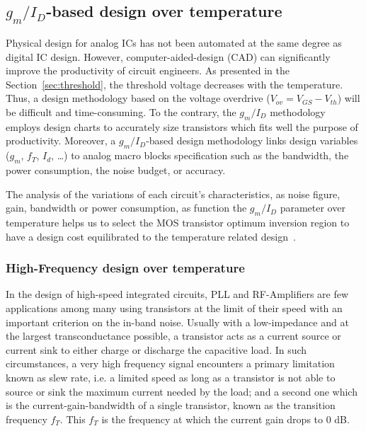 \subsection{\(g_m/I_{D} \)-based design over temperature} %
\label{sec:analog-insight}
Physical design for analog ICs has not been automated at the same degree as digital IC design. However, computer-aided-design (CAD) can significantly improve the productivity of circuit engineers. As presented in the Section~\ref{sec:threshold}, the threshold voltage decreases with the temperature. Thus, a design methodology based on the voltage overdrive ($V_{ov} = V_{GS}-V_{th}$) will be difficult and time-consuming. To the contrary, the \(g_m/I_{D} \) methodology employs design charts to accurately size transistors which fits well the purpose of productivity. Moreover, a \(g_m/I_{D} \)-based design methodology links design variables (\(g_m \), \(f_T \), \(I_d \), \ldots) to analog macro blocks specification such as the bandwidth, the power consumption, the noise budget, or accuracy.

The analysis of the variations of each circuit's characteristics, as noise figure, gain, bandwidth or power consumption, as function the \(g_m/I_{D} \) parameter over temperature helps us to select the MOS transistor optimum inversion region to have a design cost equilibrated to the temperature related design~\cite{Silveira1996,Ou2014,Ou2017,Ou2018}.

\subsubsection{High-Frequency design over temperature}
\label{sec:des_speed}
In the design of high-speed integrated circuits, PLL and RF-Amplifiers are few applications among many using transistors at the limit of their speed with an important criterion on the in-band noise. Usually with a low-impedance and at the largest transconductance possible, a transistor acts as a current source or current sink to either charge or discharge the capacitive load. In such circumstances, a very high frequency signal encounters a primary limitation known as slew rate, i.e. a limited speed as long as a transistor is not able to source or sink the maximum current needed by the load; and a second one which is the current-gain-bandwidth of a single transistor, known as the transition frequency \(f_T \).  This \(f_T \) is the frequency at which the current gain drops to 0 dB.

